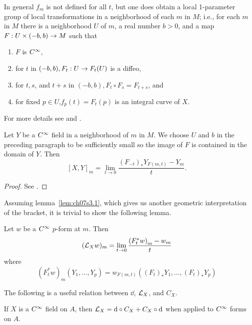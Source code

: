 \documentclass[../main]{subfiles}
\begin{document}
In general $f_{m}$ is not defined for all $t$, but one does obtain a local 1-parameter group of local transformations in a neighborhood of each $m$ in $M$; i.e., for each $m$ in $M$ there is a neighborhood $U$ of $m$, a real number $b>0$, and a map $F: U \times(-b, b) \to M$ such that
\begin{enumerate}[label=(\arabic*)]
    \item $F$ is $C^\infty$,
    \item for $t$ in $(-b, b), F_{t}: U \to F_{t}(U)$ is a diffeo,
    \item for $t, s$, and $t+s$ in $(-b, b), F_{t} \circ F_{s}=F_{t+s}$, and
    \item for fixed $p\in U$,$f_{p}(t)=F_{t}(p)$ is an integral curve of $X$.
\end{enumerate}
For more details see \cite{palais1954a, palais1957} and \cite[p.~5]{nomizu2021lie}.



\begin{lemma} \label{lem:ch7.3.2}
\label{lem:ch07s3.1}
Let $Y$ be a $C^\infty$ field in a neighborhood of $m$ in $M$. We choose $U$ and $b$ in the preceding paragraph to be sufficiently small so the image of $F$ is contained in the domain of $Y$. Then
\[
[X, Y]_{m}=\lim _{t \to 0}\dfrac{\left(F_{-t}\right)_\ast Y_{F(m, t)}-Y_{m}}{t} .
\]
\end{lemma}

\begin{proof}
See \cite[p.~8]{nomizu2021lie}.
\end{proof}



Assuming lemma~\ref{lem:ch07s3.1}, which gives us another geometric interpretation of the bracket, it is trivial to show the following lemma.



\begin{lemma} \label{lem:ch7.3.3}
Let $w$ be a $C^\infty$ $p$-form at $m$. Then
\[
(\mathcal{L}_{X} w)_{m}=\lim _{t \to 0}\dfrac{\left(F_{t}^\ast w\right)_{m}-w_{m}}{t}
\]
where
\[
(F_{t}^\ast w)_{m}(Y_{1}, \ldots, Y_{p})=w_{F(m, t)}((F_{t})_\ast Y_{1}, \ldots,(F_{t})_\ast Y_{p})
\]
\end{lemma}



The following is a useful relation between $\dd$, $\mathcal{L}_{X}$, and $C_{X}$.



\begin{proposition} \label{prop:ch7.3.3}
If $X$ is a $C^\infty$ field on $A$, then $\liederiv{X}= \dd \circ C_{X}+C_{X} \circ \dd$ when applied to $C^\infty$ forms on $A$.
\end{proposition}
\end{document}
